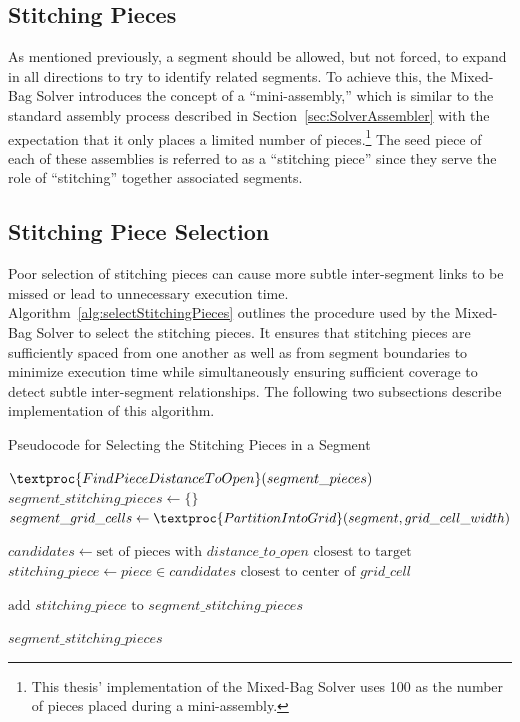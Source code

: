 \subsection{Stitching Pieces}

As mentioned previously, a segment should be allowed, but not forced, to expand in all directions to try to identify related segments.  To achieve this, the Mixed-Bag Solver introduces the concept of a ``mini-assembly,'' which is similar to the standard assembly process described in Section~\ref{sec:SolverAssembler} with the expectation that it only places a limited number of pieces.\footnote{This thesis' implementation of the Mixed-Bag Solver uses 100 as the number of pieces placed during a mini-assembly.}  The seed piece of each of these assemblies is referred to as a ``stitching piece'' since they serve the role of ``stitching'' together associated segments.

\subsection{Stitching Piece Selection}\label{sec:stitchingPieceSelection}

Poor selection of stitching pieces can cause more subtle inter-segment links to be missed or lead to unnecessary execution time.  Algorithm~\ref{alg:selectStitchingPieces} outlines the procedure used by the Mixed-Bag Solver to select the stitching pieces.  It ensures that stitching pieces are sufficiently spaced from one another as well as from segment boundaries to minimize execution time while simultaneously ensuring sufficient coverage to detect subtle inter-segment relationships.  The following two subsections describe implementation of this algorithm.

\begin{algorithm}[tb]
\caption{Pseudocode for Selecting the Stitching Pieces in a Segment}
\label{alg:selectStitchingPieces}
\begin{algorithmic}[1]
	\State $\textproc{FindPieceDistanceToOpen}(segment\_pieces)$
	\State $segment\_stitching\_pieces \gets \{ \}$
    \State $segment\_grid\_cells \gets \textproc{PartitionIntoGrid}(segment, grid\_cell\_width)$
\item []
			\State $candidates \gets \text{set of pieces with } distance\_to\_open \text{ closest to target}$
			\State $stitching\_piece \gets piece \in candidates \text{ closest to center of } grid\_cell$
\item []
			\State $\text{add } stitching\_piece \text{ to } segment\_stitching\_pieces$
		\EndIf
	\EndFor
\item []
	\State \Return $segment\_stitching\_pieces$
\EndProcedure
\end{algorithmic}
\end{algorithm}


